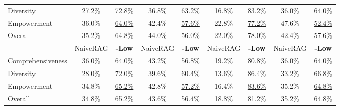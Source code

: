 \documentclass{article} %
\begin{document}
\begin{table}[t]
{\begin{tabular}{@{}lcccccccc@{}}
Diversity              & 27.2\%      & \underline{72.8\%}     & 36.8\%      & \underline{63.2\%}     & 16.8\%      & \underline{83.2\%}     & 36.0\%      & \underline{64.0\%}     \\
Empowerment            & 36.0\%      & \underline{64.0\%}     & 42.4\%      & \underline{57.6\%}     & 22.8\%      & \underline{77.2\%}     & 47.6\%      & \underline{52.4\%}     \\
Overall                & 35.2\%      & \underline{64.8\%}     & 44.0\%      & \underline{56.0\%}     & 22.0\%      & \underline{78.0\%}     & 42.4\%      & \underline{57.6\%}     \\
\cmidrule(lr){2-3} \cmidrule(lr){4-5} \cmidrule(lr){6-7} \cmidrule(lr){8-9}
                      & NaiveRAG & \textbf{-Low} & NaiveRAG & \textbf{-Low} & NaiveRAG & \textbf{-Low} & NaiveRAG & \textbf{-Low} \\
\midrule
Comprehensiveness      & 36.0\%      & \underline{64.0\%}     & 43.2\%      & \underline{56.8\%}     & 19.2\%      & \underline{80.8\%}     & 36.0\%      & \underline{64.0\%}     \\
Diversity              & 28.0\%      & \underline{72.0\%}     & 39.6\%      & \underline{60.4\%}     & 13.6\%      & \underline{86.4\%}     & 33.2\%      & \underline{66.8\%}     \\
Empowerment            & 34.8\%      & \underline{65.2\%}     & 42.8\%      & \underline{57.2\%}     & 16.4\%      & \underline{83.6\%}     & 35.2\%      & \underline{64.8\%}     \\
Overall                & 34.8\%      & \underline{65.2\%}     & 43.6\%      & \underline{56.4\%}     & 18.8\%      & \underline{81.2\%}     & 35.2\%      & \underline{64.8\%}     \\


\end{tabular}}
\end{table}
\end{document}
